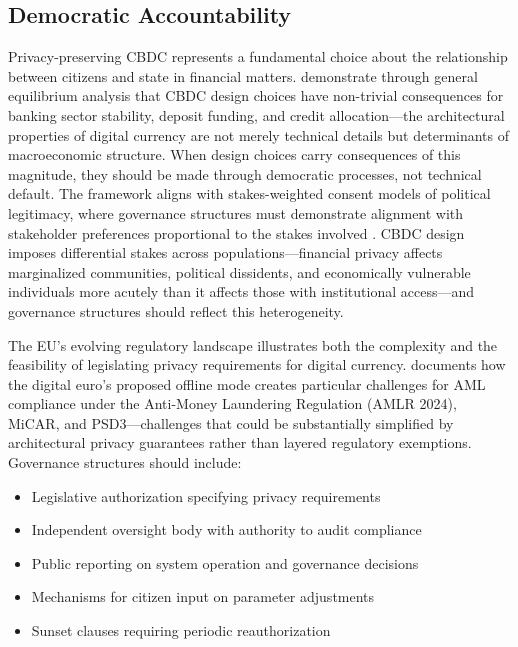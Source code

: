 \documentclass[11pt]{article}
\begin{document}
\subsection{Democratic Accountability}

Privacy-preserving CBDC represents a fundamental choice about the relationship between citizens and state in financial matters. \citet{KeisterSanches2023} demonstrate through general equilibrium analysis that CBDC design choices have non-trivial consequences for banking sector stability, deposit funding, and credit allocation---the architectural properties of digital currency are not merely technical details but determinants of macroeconomic structure. When design choices carry consequences of this magnitude, they should be made through democratic processes, not technical default. The framework aligns with stakes-weighted consent models of political legitimacy, where governance structures must demonstrate alignment with stakeholder preferences proportional to the stakes involved \citep{farzulla2025consensual}. CBDC design imposes differential stakes across populations---financial privacy affects marginalized communities, political dissidents, and economically vulnerable individuals more acutely than it affects those with institutional access---and governance structures should reflect this heterogeneity.

The EU's evolving regulatory landscape illustrates both the complexity and the feasibility of legislating privacy requirements for digital currency. \citet{Minto2024} documents how the digital euro's proposed offline mode creates particular challenges for AML compliance under the Anti-Money Laundering Regulation (AMLR 2024), MiCAR, and PSD3---challenges that could be substantially simplified by architectural privacy guarantees rather than layered regulatory exemptions. Governance structures should include:

\begin{itemize}
    \item Legislative authorization specifying privacy requirements
    \item Independent oversight body with authority to audit compliance
    \item Public reporting on system operation and governance decisions
    \item Mechanisms for citizen input on parameter adjustments
    \item Sunset clauses requiring periodic reauthorization
\end{itemize}
\end{document}
